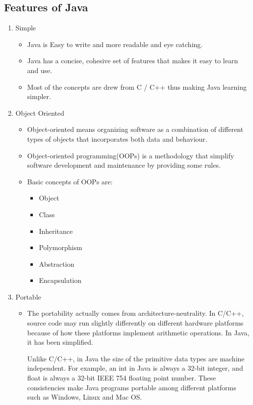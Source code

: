 \documentclass[11pt,a4paper]{article}
\begin{document}
\subsection*{Features of Java}
\begin{enumerate}
\item Simple
\begin{itemize}
\item Java is Easy to write and more readable and eye catching.
\item Java has a concise, cohesive set of features that makes it easy to learn and use.
\item Most of the concepts are drew from C / C++ thus making Java learning simpler.
\end{itemize}

\item Object Oriented
\begin{itemize}
 \item Object-oriented means organizing software as a combination of different types of objects that incorporates both data and behaviour.
 \item Object-oriented programming(OOPs) is a methodology that simplify software development and maintenance by providing some rules.
 \item Basic concepts of OOPs are:
 \begin{itemize}
   \item Object
   \item Class
   \item Inheritance
   \item Polymorphism
   \item Abstraction
  \item Encapsulation
 \end{itemize}
\end{itemize}

\item Portable
\begin{itemize}
\item The portability actually comes from architecture-neutrality. In C/C++, source code may run slightly differently on different hardware platforms because of how these platforms implement arithmetic operations. In Java, it has been simplified.

Unlike C/C++, in Java the size of the primitive data types are machine independent. For example, an int in Java is always a 32-bit integer, and float is always a 32-bit IEEE 754 floating point number. These consistencies make Java programs portable among different platforms such as Windows, Linux and Mac OS.
\end{itemize}


\end{enumerate}
\end{document}
